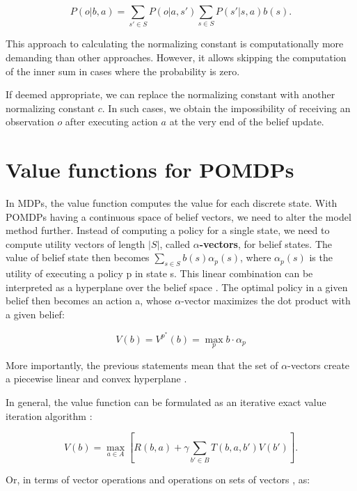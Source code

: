 \begin{equation} P(o|b, a) = \sum_{s' \in S} P(o|a, s')\sum_{s \in S} P(s'|s, a)b(s).\end{equation}

This approach to calculating the normalizing constant is computationally more demanding than other approaches. However, it allows skipping the computation of the inner sum in cases where the probability is zero.

If deemed appropriate, we can replace the normalizing constant with another normalizing constant $c$. In such cases, we obtain the impossibility of receiving an observation $o$ after executing action $a$ at the very end of the belief update.


\section{Value functions for POMDPs}
In MDPs, the value function computes the value for each discrete state. With POMDPs having a continuous space of belief vectors, we need to alter the model method further. Instead of computing a policy for a single state, we need to compute utility vectors of length $|S|$, called \textbf{$\alpha$-vectors}, for belief states. The value of belief state then becomes $\sum_{s \in S} b(s) \alpha_p(s)$, where $\alpha_p(s)$ is the utility of executing a policy p in state s. This linear combination can be interpreted as a hyperplane over the belief space \cite{pbvi}. The optimal policy in a given belief then becomes an action a, whose $\alpha$-vector maximizes the dot product with a given belief:

\begin{equation} V(b) = V^{p^*}(b) = \operatorname*{max}_p b \cdot \alpha_p \end{equation}

More importantly, the previous statements mean that the set of $\alpha$-vectors create a piecewise linear and convex hyperplane \cite{russel2010}.

In general, the value function can be formulated as an iterative exact value iteration algorithm \cite{Shani2013}:

\begin{equation} V(b) = \max_{a \in A} [R(b, a) + \gamma \sum_{b' \in B} T(b, a, b') V(b')].\end{equation}

Or, in terms of vector operations and operations on sets of vectors \cite{Shani2013}, as:

